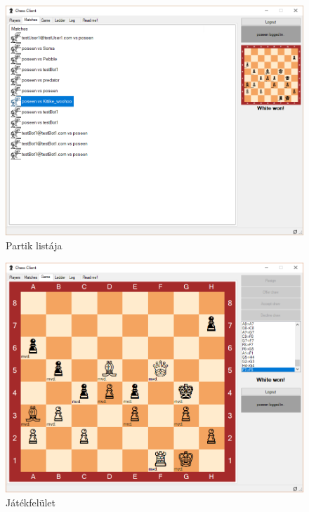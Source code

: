 \documentclass[twoside, a4paper, 12pt]{article}
\begin{document}
\begin{figure}[htbp]
	\centering
	\includegraphics[width=1\textwidth]{img/humanClientMatches.png}
	\caption{Partik listája}
	\label{fig:humanClientMatches}
\end{figure}

\begin{figure}[htbp]
	\centering
	\includegraphics[width=1\textwidth]{img/humanClientGame.png}
	\caption{Játékfelület}
	\label{fig:humanClientGame}
\end{figure}
\end{document}
